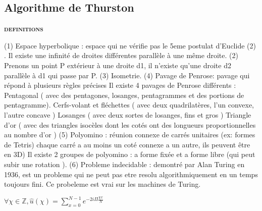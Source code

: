 \documentclass{article}
\begin{document}
\subsection{Algorithme de Thurston}


\textbf{\textsc{definitions}}

(1)	Espace hyperbolique : espace qui ne vérifie pas le 5eme postulat d’Euclide (2) . Il existe une infinité de droites différentes parallèle à une même droite.
(2)	Prenons un point  P extérieur à une droite d1, il n’existe qu’une droite d2 parallèle à d1 qui passe par P.
(3)	Isometrie.
(4)	Pavage de Penrose: pavage qui répond à plusieurs règles précises Il existe 4 pavages de Penrose différents :
Pentagonal ( avec des pentagones, losanges, pentagrammes et des portions de pentagramme).
Cerfs-volant et fléchettes ( avec deux quadrilatères, l'un convexe, l'autre concave )
Losanges ( avec deux sortes de losanges, fins et gros )
Triangle d’or ( avec des triangles isocèles dont les cotés ont des longueurs proportionnelles au nombre d’or )
(5)	Polyomino : réunion connexe de carrés unitaires (ex: formes de Tetris) chaque carré a au moins un coté connexe a un autre, ils peuvent être en 3D)
Il existe 2 groupes de polyomino : a forme fixée et a forme libre (qui peut subir une rotation ).
(6)	Probleme indecidable : demontré par Alan Turing en 1936, est un probleme qui ne peut pas etre resolu algorithmiquement en un temps toujours fini. Ce probeleme est vrai sur les machines de Turing.


$\forall \chi \in \mathbb{Z}, \hat{u}(\chi) = \sum_{x=0}^{N-1} e^{-2i\Pi\frac{\chi x}{N}}$

% 


\end{document}
